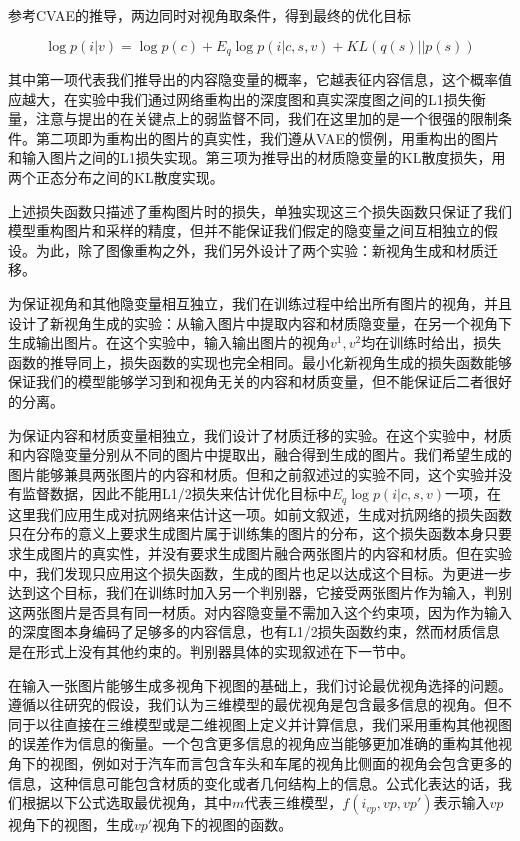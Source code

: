 \documentclass[UTF8,openany,AutoFakeBold,AutoFakeSlant,cs4size]{ctexbook}
\begin{document}
参考CVAE的推导，两边同时对视角取条件，得到最终的优化目标

\begin{equation}
	\log p(i | v)= \log p(c) + E_{q} \log p(i | c, s, v) + KL(q(s) || p(s))
\end{equation}

其中第一项代表我们推导出的内容隐变量的概率，它越表征内容信息，这个概率值应越大，在实验中我们通过网络重构出的深度图和真实深度图之间的L1损失衡量，注意与\cite{Wu2019DisentanglingCA}提出的在关键点上的弱监督不同，我们在这里加的是一个很强的限制条件。第二项即为重构出的图片的真实性，我们遵从VAE的惯例，用重构出的图片和输入图片之间的L1损失实现。第三项为推导出的材质隐变量的KL散度损失，用两个正态分布之间的KL散度实现。

上述损失函数只描述了重构图片时的损失，单独实现这三个损失函数只保证了我们模型重构图片和采样的精度，但并不能保证我们假定的隐变量之间互相独立的假设。为此，除了图像重构之外，我们另外设计了两个实验：新视角生成和材质迁移。

为保证视角和其他隐变量相互独立，我们在训练过程中给出所有图片的视角，并且设计了新视角生成的实验：从输入图片中提取内容和材质隐变量，在另一个视角下生成输出图片。在这个实验中，输入输出图片的视角$v^{1}, v^{2}​$均在训练时给出，损失函数的推导同上，损失函数的实现也完全相同。最小化新视角生成的损失函数能够保证我们的模型能够学习到和视角无关的内容和材质变量，但不能保证后二者很好的分离。

为保证内容和材质变量相独立，我们设计了材质迁移的实验。在这个实验中，材质和内容隐变量分别从不同的图片中提取出，融合得到生成的图片。我们希望生成的图片能够兼具两张图片的内容和材质。但和之前叙述过的实验不同，这个实验并没有监督数据，因此不能用L1/2损失来估计优化目标中$E_{q} \log p(i | c, s, v)$一项，在这里我们应用生成对抗网络来估计这一项。如前文叙述，生成对抗网络的损失函数只在分布的意义上要求生成图片属于训练集的图片的分布，这个损失函数本身只要求生成图片的真实性，并没有要求生成图片融合两张图片的内容和材质。但在实验中，我们发现只应用这个损失函数，生成的图片也足以达成这个目标。为更进一步达到这个目标，我们在训练时加入另一个判别器，它接受两张图片作为输入，判别这两张图片是否具有同一材质。对内容隐变量不需加入这个约束项，因为作为输入的深度图本身编码了足够多的内容信息，也有L1/2损失函数约束，然而材质信息是在形式上没有其他约束的。判别器具体的实现叙述在下一节中。

在输入一张图片能够生成多视角下视图的基础上，我们讨论最优视角选择的问题。遵循以往研究的假设，我们认为三维模型的最优视角是包含最多信息的视角。但不同于以往直接在三维模型或是二维视图上定义并计算信息，我们采用重构其他视图的误差作为信息的衡量。一个包含更多信息的视角应当能够更加准确的重构其他视角下的视图，例如对于汽车而言包含车头和车尾的视角比侧面的视角会包含更多的信息，这种信息可能包含材质的变化或者几何结构上的信息。公式化表达的话，我们根据以下公式选取最优视角，其中$m$代表三维模型，$f(i_{vp}, vp, vp')$表示输入$vp$视角下的视图，生成$vp'$视角下的视图的函数。
\end{document}
